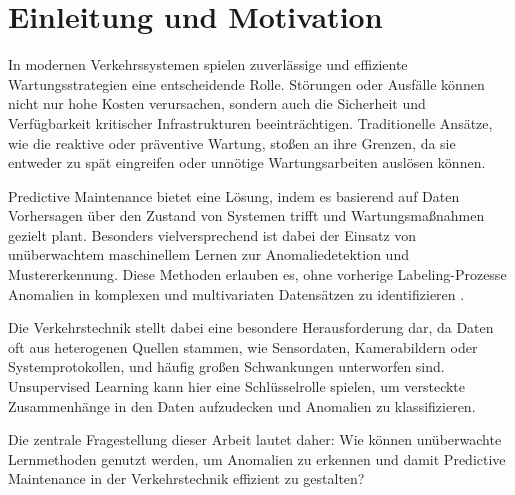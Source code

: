 \chapter{Einleitung und Motivation}
In modernen Verkehrssystemen spielen zuverlässige und effiziente Wartungsstrategien eine entscheidende Rolle. Störungen oder Ausfälle können nicht nur hohe Kosten verursachen,
sondern auch die Sicherheit und Verfügbarkeit kritischer Infrastrukturen beeinträchtigen. Traditionelle Ansätze, wie die reaktive oder präventive Wartung, stoßen an ihre Grenzen,
da sie entweder zu spät eingreifen oder unnötige Wartungsarbeiten auslösen können.

Predictive Maintenance bietet eine Lösung, indem es basierend auf Daten Vorhersagen über den Zustand von Systemen trifft und Wartungsmaßnahmen gezielt plant. Besonders vielversprechend
ist dabei der Einsatz von unüberwachtem maschinellem Lernen zur Anomaliedetektion und Mustererkennung. Diese Methoden erlauben es, ohne vorherige Labeling-Prozesse Anomalien in komplexen
und multivariaten Datensätzen zu identifizieren \cite{Wenig2024}.

Die Verkehrstechnik stellt dabei eine besondere Herausforderung dar, da Daten oft aus heterogenen Quellen stammen, wie Sensordaten, Kamerabildern oder Systemprotokollen, und häufig großen Schwankungen unterworfen sind. Unsupervised Learning kann hier eine Schlüsselrolle spielen, um versteckte Zusammenhänge in den Daten aufzudecken und Anomalien zu klassifizieren.

Die zentrale Fragestellung dieser Arbeit lautet daher:
Wie können unüberwachte Lernmethoden genutzt werden, um Anomalien zu erkennen und damit Predictive Maintenance in der Verkehrstechnik effizient zu gestalten?